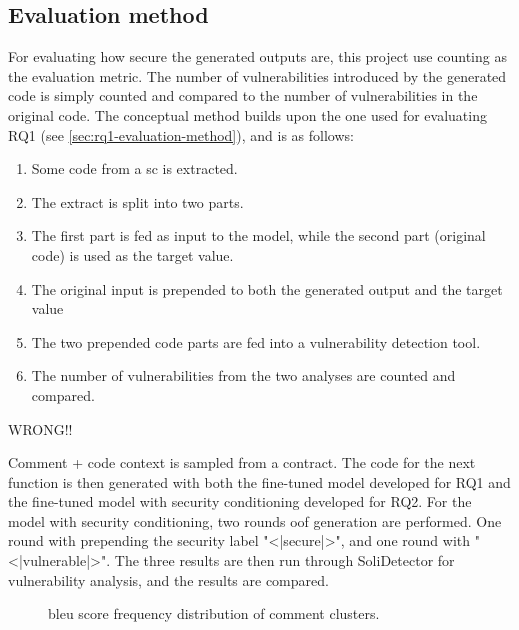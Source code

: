 \subsection{Evaluation method}
\label{sec:rq2-evaluation-method}
For evaluating how secure the generated outputs are, this project use counting as the evaluation metric. The number of vulnerabilities introduced by the generated code is simply counted and compared to the number of vulnerabilities in the original code. The conceptual method builds upon the one used for evaluating RQ1 (see \cref{sec:rq1-evaluation-method}), and is as follows:
\begin{enumerate}
    \item Some code from a \acrshort{sc} is extracted.
    \item The extract is split into two parts.
    \item The first part is fed as input to the model, while the second part (original code) is used as the target value.
    \item The original input is prepended to both the generated output and the target value
    \item The two prepended code parts are fed into a vulnerability detection tool.
    \item The number of vulnerabilities from the two analyses are counted and compared.
\end{enumerate}
WRONG!!

Comment + code context is sampled from a contract. The code for the next function is then generated with both the fine-tuned model developed for RQ1 and the fine-tuned model with security conditioning developed for RQ2. For the model with security conditioning, two rounds oof generation are performed. One round with prepending the security label "<|secure|>", and one round with "<|vulnerable|>". The three results are then run through SoliDetector for vulnerability analysis, and the results are compared.


\begin{figure}[htp]
    \centering
    
    \caption{\acrshort{bleu} score frequency distribution of comment clusters.}
    \label{fig:performance-code-context_audit_secure}
\end{figure}

